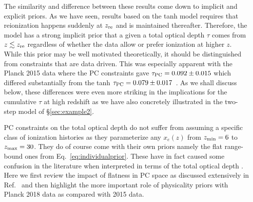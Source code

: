 \documentclass[aps,prd,twocolumn,amsmath,amssymb,showpacs,floatfix,superscriptaddress,nofootinbib]{revtex4-1}
\begin{document}
The similarity and difference between these results come down to implicit and explicit priors. As we have seen, 
results based on the tanh model requires that reionization happens suddenly at $z_{\rm re}$ and is maintained thereafter.   Therefore, the model has a strong implicit prior that a given a total optical depth $\tau$ comes from $z\lesssim z_{\rm re}$ regardless of whether the data allow or prefer
ionization at higher $z$. While this prior may be well motivated theoretically, it should be distinguished from constraints that are data driven.  
This was especially apparent with the Planck 2015 data where the PC constraints gave $\tau_{\rm PC}=0.092\pm0.015$ which differed substantially from the tanh $\tau_{\rm PC}=0.079\pm0.017$~\cite{Heinrich:2016ojb}.  
As we shall discuss below, these differences were even more striking in the implications for the cumulative $\tau$ at high redshift as we have also concretely illustrated in the two-step model of \S \ref{sec:example2}.

PC constraints on the total optical depth do not suffer from assuming a specific class of ionization histories as they parameterize any $x_e(z)$ from $z_{\rm min}=6$ to $z_{\rm max}=30$.
They do of course come with their own priors namely the flat
range-bound ones from Eq.~\ref{eq:individualprior}.
These have in fact caused some confusion in the literature when interpreted in terms of the total optical depth \cite{Millea:2018bko}.  Here we first review the impact of flatness in PC space as discussed extensively in Ref.~\cite{Heinrich:2018btc} and then highlight the more important role of physicality priors with Planck 2018 data as compared with
2015 data.
\end{document}
